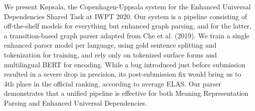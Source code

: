We present Køpsala, the Copenhagen-Uppsala system for the Enhanced Universal Dependencies Shared Task at IWPT 2020. Our system is a pipeline consisting of off-the-shelf models for everything but enhanced graph parsing, and for the latter, a transition-based graph parser adapted from Che et al. (2019). We train a single enhanced parser model per language, using gold sentence splitting and tokenization for training, and rely only on tokenized surface forms and multilingual BERT for encoding. While a bug introduced just before submission resulted in a severe drop in precision, its post-submission fix would bring us to 4th place in the official ranking, according to average ELAS. Our parser demonstrates that a unified pipeline is effective for both Meaning Representation Parsing and Enhanced Universal Dependencies.
